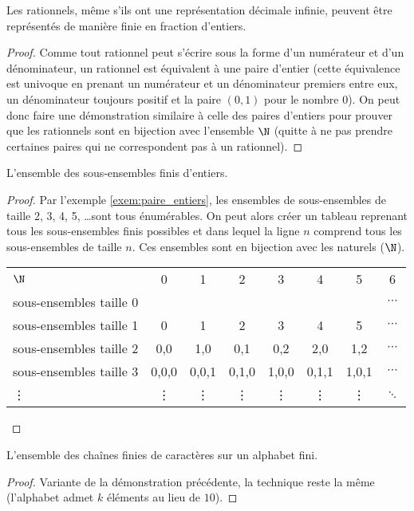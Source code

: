\begin{myexem}
 Les rationnels, même s'ils ont une représentation décimale infinie, peuvent être représentés de manière finie en fraction d'entiers. 
	 \begin{proof} 
	 	 Comme tout rationnel peut s'écrire sous la forme d'un numérateur et d'un dénominateur, un rationnel est équivalent à une paire d'entier (cette équivalence est univoque en prenant un numérateur et un dénominateur premiers entre eux, un dénominateur toujours positif et la paire $(0,1)$ pour le nombre $0$). On peut donc faire une démonstration similaire à celle des paires d'entiers pour prouver que les rationnels sont en bijection avec l'ensemble $\N$ (quitte à ne pas prendre certaines paires qui ne correspondent pas à un rationnel). 
	 \end{proof}
 \end{myexem}
  
\begin{myexem}  
  L'ensemble des sous-ensembles finis d'entiers.
  \begin{proof}
  Par l'exemple \ref{exem:paire_entiers}, les ensembles de sous-ensembles de taille 2, 3, 4, 5, \dots sont tous énumérables. On peut alors créer un tableau reprenant tous les sous-ensembles finis possibles et dans lequel la ligne $n$ comprend tous les sous-ensembles de taille $n$. Ces ensembles sont en bijection avec les naturels ($\N$).
  
    \begin{tabular}{ l c c  c  c c c  c }
 	 $\N$ & 0 & 1 & 2  & 3 & 4 & 5 & 6  \\
 	 sous-ensembles  taille 0  & {} & {} & {} & {} & {} & {}  & $\cdots$ \\
 	 sous-ensembles  taille 1  & {0} & {1} & {2} & {3} & {4} & {5} & $\cdots$ \\
 	 sous-ensembles  taille 2  & {0,0} & {1,0} & {0,1} & {0,2} & {2,0} & {1,2}  & $\cdots$ \\
 	 sous-ensembles  taille 3  & {0,0,0} & {0,0,1} & {0,1,0} & {1,0,0} & {0,1,1} & {1,0,1}  & $\cdots$ \\
 	 \vdots  & {\vdots} & {\vdots} & {\vdots} & {\vdots} & {\vdots} & {\vdots}  & $\ddots$ \\
	\end{tabular}
  \end{proof}
\end{myexem}

\begin{myexem}
\label{exem:chaines_finies}
  L'ensemble des chaînes finies de caractères sur un alphabet fini.
\begin{proof}
 Variante de la démonstration précédente, la technique reste la même (l'alphabet admet $k$ éléments au lieu de $10$).
\end{proof}
\end{myexem}

